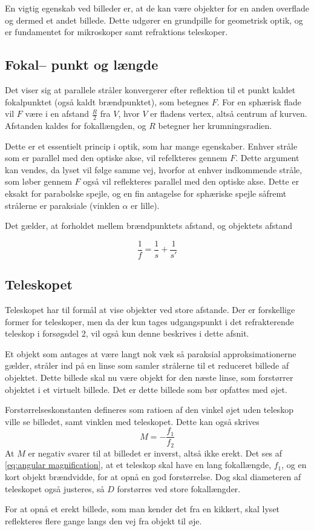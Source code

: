 En vigtig egenskab ved billeder er, at de kan være objekter for en anden overflade og dermed et andet billede. Dette udgører en grundpille for geometrisk optik, og er fundamentet for mikroskoper samt refraktions teleskoper.


\subsection{Fokal-- punkt og længde}
Det viser sig at parallele stråler konvergerer efter reflektion til et punkt
kaldet fokalpunktet (også kaldt brændpunktet), som betegnes $F$. For en sphærisk flade vil $F$ være i en afstand $\frac{R}{2}$ fra $V$, hvor $V$ er fladens vertex, altså centrum af kurven. Afstanden kaldes for fokallængden, og $R$ betegner her krumningsradien.

Dette er et  essentielt princip i optik, som har mange egenskaber.
Enhver stråle som er parallel med den optiske akse, vil refelkteres gennem $F$. Dette argument kan vendes, da lyset vil følge samme vej, hvorfor at enhver indkommende stråle, som løber gennem $F$ også vil reflekteres parallel med den optiske akse. Dette er eksakt for parabolske spejle, og en fin antagelse for sphæriske spejle såfremt strålerne er paraksiale (vinklen $\alpha$ er lille).

Det gælder, at forholdet mellem brændpunktets afstand, og objektets afstand

\begin{equation}
    \frac{1}{f} = \frac{1}{s} + \frac{1}{s'}
    \label{eq:fokalvokal}
\end{equation}

\subsection{Teleskopet}
Teleskopet har til formål at vise objekter ved store afstande. Der er forskellige former for teleskoper, men da der kun tages udgangspunkt i det refrakterende teleskop i forsøgsdel $2$, vil også kun denne beskrives i dette afsnit.

Et objekt som antages at være langt nok væk så paraksial approksimationerne gælder, stråler ind på en linse som samler strålerne til et reduceret billede af objektet. Dette billede skal nu være objekt for den næste linse, som forstørrer objektet i et virtuelt billede. Det er dette billede som bør opfattes med øjet.

Forstørrelseskonstanten defineres som ratioen af den vinkel øjet uden teleskop ville se billedet, samt vinklen med teleskopet. Dette kan også skrives
\begin{equation}
    M = - \frac{f_1}{f_2}
    \label{eq:angular magnification}
\end{equation}
At $M$ er negativ svarer til at billedet er inverst, altså ikke erekt. Det ses af \cref{eq:angular magnification}, at et teleskop skal have en lang fokallængde, $f_1$, og en kort objekt brændvidde, for at opnå en god forstørrelse. Dog skal diameteren af teleskopet også justeres, så $D$ forstørres ved store fokallængder.

For at opnå et erekt billede, som man kender det fra en kikkert, skal lyset reflekteres flere gange langs den vej fra objekt til øje.
